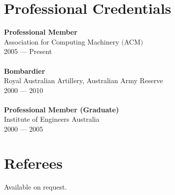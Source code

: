 \documentclass[a4paper]{article}
\begin{document}
\section*{Professional Credentials}
\textbf{Professional Member}\\
Association for Computing Machinery $($ACM$)$\\
2005 --- Present\\\\
\textbf{Bombardier}\\
Royal Australian Artillery, Australian Army Reserve\\
2000 --- 2010\\\\
\textbf{Professional Member (Graduate)}\\
Institute of Engineers Australia\\
2000 --- 2005
\section*{Referees}
Available on request.
\end{document}
